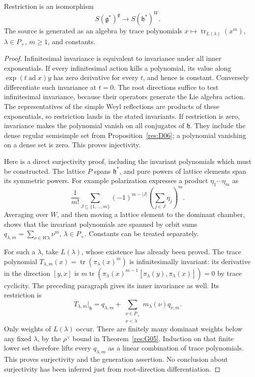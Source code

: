 \begin{theorem}
\label{res:H07}
Restriction is an isomorphism
\[
 S(\mathfrak g^*)^{\mathfrak g}\longrightarrow
 S(\mathfrak h^*)^W .
\]
The source is generated as an algebra by trace polynomials
\(x\mapsto\operatorname{tr}_{L(\lambda)}(x^m)\),
\(\lambda\in P_+\), \(m\geq1\), and constants.
\end{theorem}
\begin{proof}
Infinitesimal invariance is equivalent to invariance under all
inner exponentials. If every infinitesimal action kills a
polynomial, its value along \(\exp(t\operatorname{ad}x)y\) has
zero derivative for every \(t\), and hence is constant.
Conversely differentiate such invariance at \(t=0\).
The root directions suffice to test infinitesimal invariance,
because their operators generate the Lie algebra action.
The representatives of the simple Weyl reflections are products
of these exponentials, so restriction lands in the stated
invariants. If restriction is zero, invariance makes the polynomial
vanish on all conjugates of \(\mathfrak h\).
They include the dense regular semisimple set from
Proposition~\ref{res:D06}; a polynomial vanishing on a dense set
is zero. This proves injectivity.

Here is a direct surjectivity proof, including the invariant
polynomials which must be constructed. The lattice \(P\) spans
\(\mathfrak h^*\), and pure powers of lattice elements span its
symmetric powers. For example polarization expresses a product
\(\eta_1\cdots\eta_m\) as
\[
 \frac1{m!}\sum_{J\subseteq\{1,\ldots,m\}}
       (-1)^{m-|J|}\left(\sum_{j\in J}\eta_j\right)^m.
\]
Averaging over \(W\), and then moving a lattice element to the
dominant chamber, shows that the invariant polynomials are spanned
by orbit sums
\(q_{\lambda,m}=\sum_{\nu\in W\lambda}\nu^m\),
\(\lambda\in P_+\). Constants can be treated separately.

For such a \(\lambda\), take \(L(\lambda)\), whose existence has
already been proved. The trace polynomial
\(T_{\lambda,m}(x)=\operatorname{tr}(\pi_\lambda(x)^m)\)
is infinitesimally invariant: its derivative in the direction
\([y,x]\) is
\(m\operatorname{tr}(\pi_\lambda(x)^{m-1}
[\pi_\lambda(y),\pi_\lambda(x)])=0\) by trace cyclicity.
The preceding paragraph gives its inner invariance as well.
Its restriction is
\[
 T_{\lambda,m}|_{\mathfrak h}
   =q_{\lambda,m}
     +\sum_{\substack{\nu\in P_+\\\nu<\lambda}}
                  m_\lambda(\nu)q_{\nu,m}.
\]
Only weights of \(L(\lambda)\) occur. There are finitely many
dominant weights below any fixed \(\lambda\), by the
\(\rho^\vee\) bound in Theorem~\ref{res:G05}.
Induction on that finite lower set therefore lifts every
\(q_{\lambda,m}\) as a linear combination of trace polynomials.
This proves surjectivity and the generation assertion.
No conclusion about surjectivity has been inferred just from
root-direction differentiation.
\end{proof}

